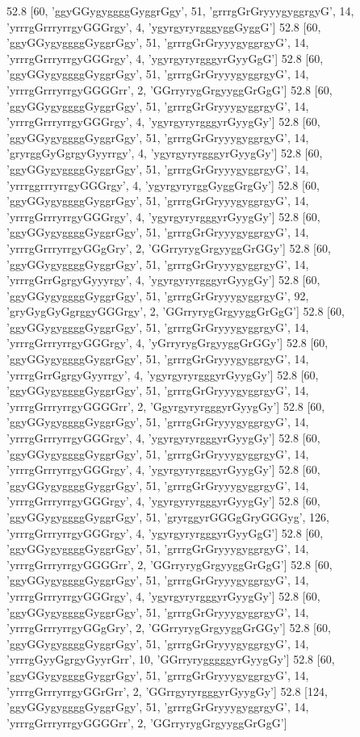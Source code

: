 52.8 [60, 'ggyGGygyggggGyggrGgy', 51, 'grrrgGrGryyygyggrgyG', 14, 'yrrrgGrrryrrgyGGGrgy', 4, 'ygyrgyryrgggyggGyggG']
52.8 [60, 'ggyGGygyggggGyggrGgy', 51, 'grrrgGrGryyygyggrgyG', 14, 'yrrrgGrrryrrgyGGGrgy', 4, 'ygyrgyryrgggyrGyyGgG']
52.8 [60, 'ggyGGygyggggGyggrGgy', 51, 'grrrgGrGryyygyggrgyG', 14, 'yrrrgGrrryrrgyGGGGrr', 2, 'GGrryrygGrgyyggGrGgG']
52.8 [60, 'ggyGGygyggggGyggrGgy', 51, 'grrrgGrGryyygyggrgyG', 14, 'yrrrgGrrryrrgyGGGrgy', 4, 'ygyrgyryrgggyrGyygGy']
52.8 [60, 'ggyGGygyggggGyggrGgy', 51, 'grrrgGrGryyygyggrgyG', 14, 'gryrggGyGgrgyGyyrrgy', 4, 'ygyrgyryrgggyrGyygGy']
52.8 [60, 'ggyGGygyggggGyggrGgy', 51, 'grrrgGrGryyygyggrgyG', 14, 'yrrrggrrryrrgyGGGrgy', 4, 'ygyrgyryrggGyggGrgGy']
52.8 [60, 'ggyGGygyggggGyggrGgy', 51, 'grrrgGrGryyygyggrgyG', 14, 'yrrrgGrrryrrgyGGGrgy', 4, 'ygyrgyryrgggyrGyygGy']
52.8 [60, 'ggyGGygyggggGyggrGgy', 51, 'grrrgGrGryyygyggrgyG', 14, 'yrrrgGrrryrrgyGGgGry', 2, 'GGrryrygGrgyyggGrGGy']
52.8 [60, 'ggyGGygyggggGyggrGgy', 51, 'grrrgGrGryyygyggrgyG', 14, 'yrrrgGrrGgrgyGyyyrgy', 4, 'ygyrgyryrgggyrGyygGy']
52.8 [60, 'ggyGGygyggggGyggrGgy', 51, 'grrrgGrGryyygyggrgyG', 92, 'gryGygGyGgrggyGGGrgy', 2, 'GGrryrygGrgyyggGrGgG']
52.8 [60, 'ggyGGygyggggGyggrGgy', 51, 'grrrgGrGryyygyggrgyG', 14, 'yrrrgGrrryrrgyGGGrgy', 4, 'yGrryrygGrgyyggGrGGy']
52.8 [60, 'ggyGGygyggggGyggrGgy', 51, 'grrrgGrGryyygyggrgyG', 14, 'yrrrgGrrGgrgyGyyrrgy', 4, 'ygyrgyryrgggyrGyygGy']
52.8 [60, 'ggyGGygyggggGyggrGgy', 51, 'grrrgGrGryyygyggrgyG', 14, 'yrrrgGrrryrrgyGGGGrr', 2, 'GgyrgyryrgggyrGyygGy']
52.8 [60, 'ggyGGygyggggGyggrGgy', 51, 'grrrgGrGryyygyggrgyG', 14, 'yrrrgGrrryrrgyGGGrgy', 4, 'ygyrgyryrgggyrGyygGy']
52.8 [60, 'ggyGGygyggggGyggrGgy', 51, 'grrrgGrGryyygyggrgyG', 14, 'yrrrgGrrryrrgyGGGrgy', 4, 'ygyrgyryrgggyrGyygGy']
52.8 [60, 'ggyGGygyggggGyggrGgy', 51, 'grrrgGrGryyygyggrgyG', 14, 'yrrrgGrrryrrgyGGGrgy', 4, 'ygyrgyryrgggyrGyygGy']
52.8 [60, 'ggyGGygyggggGyggrGgy', 51, 'gryrggyrGGGgGryGGGyg', 126, 'yrrrgGrrryrrgyGGGrgy', 4, 'ygyrgyryrgggyrGyyGgG']
52.8 [60, 'ggyGGygyggggGyggrGgy', 51, 'grrrgGrGryyygyggrgyG', 14, 'yrrrgGrrryrrgyGGGGrr', 2, 'GGrryrygGrgyyggGrGgG']
52.8 [60, 'ggyGGygyggggGyggrGgy', 51, 'grrrgGrGryyygyggrgyG', 14, 'yrrrgGrrryrrgyGGGrgy', 4, 'ygyrgyryrgggyrGyygGy']
52.8 [60, 'ggyGGygyggggGyggrGgy', 51, 'grrrgGrGryyygyggrgyG', 14, 'yrrrgGrrryrrgyGGgGry', 2, 'GGrryrygGrgyyggGrGGy']
52.8 [60, 'ggyGGygyggggGyggrGgy', 51, 'grrrgGrGryyygyggrgyG', 14, 'yrrrgGyyGgrgyGyyrGrr', 10, 'GGrryrygggggyrGyygGy']
52.8 [60, 'ggyGGygyggggGyggrGgy', 51, 'grrrgGrGryyygyggrgyG', 14, 'yrrrgGrrryrrgyGGrGrr', 2, 'GGrrgyryrgggyrGyygGy']
52.8 [124, 'ggyGGygyggggGyggrGgy', 51, 'grrrgGrGryyygyggrgyG', 14, 'yrrrgGrrryrrgyGGGGrr', 2, 'GGrryrygGrgyyggGrGgG']
